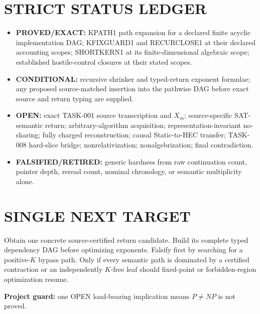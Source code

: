 \documentclass[11pt]{article}
\begin{document}
\section*{STRICT STATUS LEDGER}
\begin{itemize}
\item \textbf{PROVED/EXACT:} KPATH1 path expansion for a declared finite acyclic implementation DAG; KFIXGUARD1 and RECURCLOSE1 at their declared accounting scopes; SHORTKERN1 at its finite-dimensional algebraic scope; established hostile-control closures at their stated scopes.
\item \textbf{CONDITIONAL:} recursive shrinker and typed-return exponent formulae; any proposed source-matched insertion into the pathwise DAG before exact source and return typing are supplied.
\item \textbf{OPEN:} exact TASK-001 source transcription and \(X_m\); source-specific SAT-semantic return; arbitrary-algorithm acquisition; representation-invariant no-sharing; fully charged reconstruction; causal Static-to-HEC transfer; TASK-008 hard-slice bridge; nonrelativization; nonalgebrization; final contradiction.
\item \textbf{FALSIFIED/RETIRED:} generic hardness from raw continuation count, pointer depth, reread count, nominal chronology, or semantic multiplicity alone.
\end{itemize}

\section*{SINGLE NEXT TARGET}
Obtain one concrete source-certified return candidate. Build its complete typed dependency DAG before optimizing exponents. Falsify first by searching for a positive-\(K\) bypass path. Only if every semantic path is dominated by a certified contraction or an independently \(K\)-free leaf should fixed-point or forbidden-region optimization resume.

\bigskip
\noindent\textbf{Project guard:} one OPEN load-bearing implication means \(P\neq NP\) is not proved.

\end{document}
